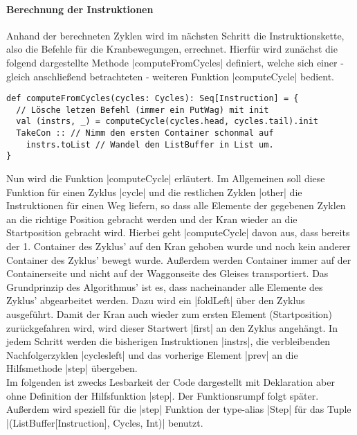 \paragraph{Berechnung der Instruktionen}
Anhand der berechneten Zyklen wird im nächsten Schritt die Instruktionskette, also die Befehle für die Kranbewegungen, errechnet.
Hierfür wird zunächst die folgend dargestellte Methode |computeFromCycles| definiert,
welche sich einer - gleich anschließend betrachteten - weiteren Funktion |computeCycle| bedient.
\lstset{basicstyle=\ttfamily}
\begin{lstlisting}
def computeFromCycles(cycles: Cycles): Seq[Instruction] = {
  // Lösche letzen Befehl (immer ein PutWag) mit init
  val (instrs, _) = computeCycle(cycles.head, cycles.tail).init
  TakeCon :: // Nimm den ersten Container schonmal auf
    instrs.toList // Wandel den ListBuffer in List um.
}
\end{lstlisting}
\lstset{basicstyle=\ttfamily}
Nun wird die Funktion |computeCycle| erläutert.
Im Allgemeinen soll diese Funktion für einen Zyklus |cycle| und die restlichen Zyklen |other| die Instruktionen für einen Weg liefern,
so dass alle Elemente der gegebenen Zyklen an die richtige Position gebracht werden und der Kran wieder an die Startposition gebracht wird.
Hierbei geht |computeCycle| davon aus, dass bereits der 1. Container des Zyklus' auf den Kran gehoben wurde und noch kein anderer Container des Zyklus' bewegt wurde.
Außerdem werden Container immer auf der Containerseite und nicht auf der Waggonseite des Gleises transportiert.
Das Grundprinzip des Algorithmus' ist es, dass nacheinander alle Elemente des Zyklus' abgearbeitet werden.
Dazu wird ein |foldLeft| über den Zyklus ausgeführt.
Damit der Kran auch wieder zum ersten Element (Startposition) zurückgefahren wird, wird dieser Startwert |first| an den Zyklus angehängt.
In jedem Schritt werden die bisherigen Instruktionen |instrs|, die verbleibenden Nachfolgerzyklen |cyclesleft| und das vorherige Element |prev|
an die Hilfsmethode |step| übergeben. \\
Im folgenden ist zwecks Lesbarkeit der Code dargestellt mit Deklaration aber ohne Definition der Hilfsfunktion |step|.
Der Funktionsrumpf folgt später.
Außerdem wird speziell für die |step| Funktion der type-alias |Step| für das Tuple |(ListBuffer[Instruction], Cycles, Int)| benutzt.
\lstset{basicstyle=\ttfamily}
